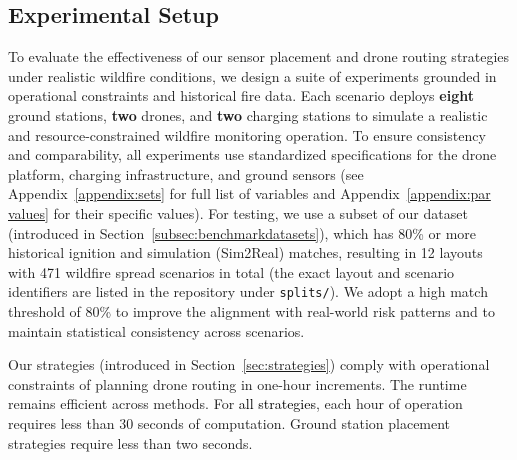 \documentclass{article}
\newcommand{\blue}[1]{\textcolor{black}{#1}}
\begin{document}


\subsection{Experimental Setup}

To evaluate the effectiveness of our sensor placement and drone routing strategies under realistic wildfire conditions, we design a suite of experiments grounded in operational constraints and historical fire data. Each scenario deploys \textbf{eight} ground stations, \textbf{two} drones, and \textbf{two} charging stations to simulate a realistic and resource-constrained wildfire monitoring operation. To ensure consistency and comparability, all experiments use standardized specifications for the drone platform, charging infrastructure, and ground sensors (see Appendix~\ref{appendix:sets} for full list of variables and Appendix~\ref{appendix:par values} for their specific values). For testing, we use a subset of our dataset (introduced in Section~\ref{subsec:benchmarkdatasets}), which has 80\% or more historical ignition and simulation (Sim2Real) matches, resulting in 12 layouts with 471 wildfire spread scenarios in total (the exact layout and scenario identifiers are listed in the repository under \texttt{splits/}). We adopt a high match threshold of 80\% to improve the alignment with real-world risk patterns and to maintain statistical consistency across scenarios.

Our strategies (introduced in Section~\ref{sec:strategies}) comply with operational constraints of planning drone routing in one-hour increments. The runtime remains efficient across methods. For \blue{all strategies}, each hour of operation requires less than 30 seconds of computation. 
Ground station placement strategies require less than two seconds.
\end{document}
